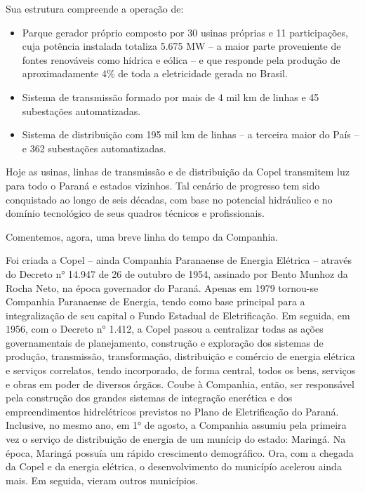 \documentclass[grad,numbers]{coppe}
\providecommand{\tightlist}{%
  \setlength{\itemsep}{0pt}\setlength{\parskip}{0pt}}
\begin{document}
  Sua estrutura compreende a operação de:
  \begin{itemize}
  \tightlist
  \item
    Parque gerador próprio composto por 30 usinas próprias e 11 participações, cuja potência instalada totaliza 5.675 MW -- a maior parte proveniente de fontes renováveis como hídrica e eólica -- e que responde pela produção de aproximadamente 4\% de toda a eletricidade gerada no Brasil.
  \item
    Sistema de transmissão formado por mais de 4 mil km de linhas e 45 subestações automatizadas.
  \item
    Sistema de distribuição com 195 mil km de linhas -- a terceira maior do País -- e 362 subestações automatizadas.
  \end{itemize}
  Hoje as usinas, linhas de transmissão e de distribuição da Copel transmitem luz para todo o Paraná e estados vizinhos. Tal cenário de progresso tem sido conquistado ao longo de seis décadas, com base no potencial hidráulico e no domínio tecnológico de seus quadros técnicos e profissionais.

  Comentemos, agora, uma breve linha do tempo da Companhia.

  Foi criada a Copel -- ainda Companhia Paranaense de Energia Elétrica -- através do Decreto n° 14.947 de 26 de outubro de 1954, assinado por Bento Munhoz da Rocha Neto, na época governador do Paraná. Apenas em 1979 tornou-se Companhia Paranaense de Energia, tendo como base principal para a integralização de seu capital o Fundo Estadual de Eletrificação. Em seguida, em 1956, com o Decreto n° 1.412, a Copel passou a centralizar todas as ações governamentais de planejamento, construção e exploração dos sistemas de produção, transmissão, transformação, distribuição e comércio de energia elétrica e serviços correlatos, tendo incorporado, de forma central, todos os bens, serviços e obras em poder de diversos órgãos. Coube à Companhia, então, ser responsável pela construção dos grandes sistemas de integração enerética e dos empreendimentos hidrelétricos previstos no Plano de Eletrificação do Paraná. Inclusive, no mesmo ano, em 1° de agosto, a Companhia assumiu pela primeira vez o serviço de distribuição de energia de um munícip do estado: Maringá. Na época, Maringá possuía um rápido crescimento demográfico. Ora, com a chegada da Copel e da energia elétrica, o desenvolvimento do municípío acelerou ainda mais. Em seguida, vieram outros municípios.
\end{document}
